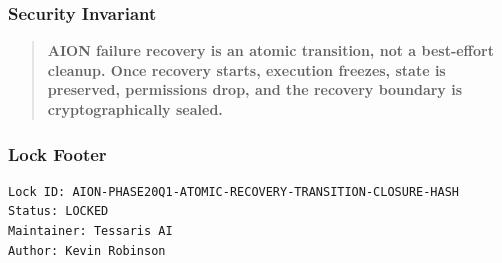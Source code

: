 \subsubsection{Security Invariant}

\begin{quote}
\textbf{AION failure recovery is an atomic transition, not a best-effort cleanup. Once recovery starts, execution freezes, state is preserved, permissions drop, and the recovery boundary is cryptographically sealed.}
\end{quote}

\subsubsection{Lock Footer}

\begin{verbatim}
Lock ID: AION-PHASE20Q1-ATOMIC-RECOVERY-TRANSITION-CLOSURE-HASH
Status: LOCKED
Maintainer: Tessaris AI
Author: Kevin Robinson
\end{verbatim}
